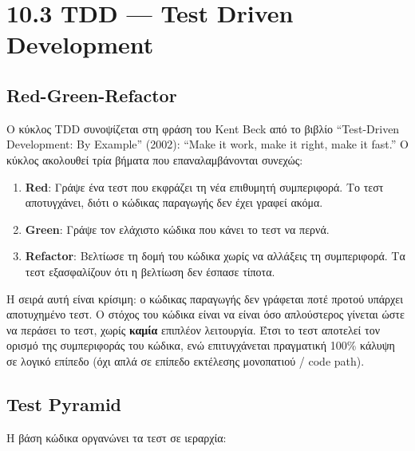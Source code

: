 \section{10.3 TDD --- Test Driven
Development}\label{tdd-test-driven-development}

\subsection{Red-Green-Refactor}\label{red-green-refactor}

Ο κύκλος TDD συνοψίζεται στη φράση του Kent Beck από το βιβλίο
``Test-Driven Development: By Example'' (2002): ``Make it work, make it
right, make it fast.'' Ο κύκλος ακολουθεί τρία βήματα που
επαναλαμβάνονται συνεχώς:

\begin{enumerate}
\def\labelenumi{\arabic{enumi}.}
\tightlist
\item
  \textbf{Red}: Γράψε ένα τεστ που εκφράζει τη νέα επιθυμητή
  συμπεριφορά. Το τεστ αποτυγχάνει, διότι ο κώδικας παραγωγής δεν έχει
  γραφεί ακόμα.
\item
  \textbf{Green}: Γράψε τον ελάχιστο κώδικα που κάνει το τεστ να περνά.
\item
  \textbf{Refactor}: Βελτίωσε τη δομή του κώδικα χωρίς να αλλάξεις τη
  συμπεριφορά. Τα τεστ εξασφαλίζουν ότι η βελτίωση δεν έσπασε τίποτα.
\end{enumerate}

Η σειρά αυτή είναι κρίσιμη: ο κώδικας παραγωγής δεν γράφεται ποτέ προτού
υπάρχει αποτυχημένο τεστ. Ο στόχος του κώδικα είναι να είναι όσο
απλούστερος γίνεται ώστε να περάσει το τεστ, χωρίς \textbf{καμία}
επιπλέον λειτουργία. Έτσι το τεστ αποτελεί τον ορισμό της συμπεριφοράς
του κώδικα, ενώ επιτυγχάνεται πραγματική 100\% κάλυψη σε λογικό επίπεδο
(όχι απλά σε επίπεδο εκτέλεσης μονοπατιού / code path).

\subsection{Test Pyramid}\label{test-pyramid}

Η βάση κώδικα οργανώνει τα τεστ σε ιεραρχία:


